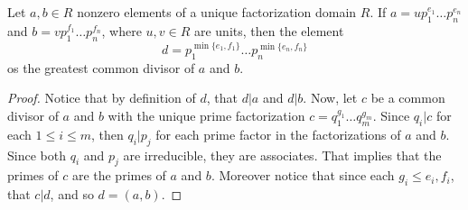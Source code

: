 \begin{proposition}\label{proposition_6.3.4}
  Let $a,b \in R$ nonzero elements of a unique factorization domain $R$. If
  $a=up_1^{e_1} \dots p_n^{e_n}$ and $b=vp_1^{f_1} \dots p_n^{f_n}$, where
  $u,v \in R$ are units, then the element
  \begin{equation*}
    d=p_1^{\min\{e_1,f_1\}} \dots p_n^{\min\{e_n,f_n\}}
  \end{equation*}
  os the greatest common divisor of $a$ and  $b$.
\end{proposition}
\begin{proof}
  Notice that by definition of $d$, that  $d|a$ and  $d|b$. Now, let  $c$ be a
  common divisor of  $a$ and  $b$ with the unique prime factorization
  $c=q_1^{g_1} \dots q_m^{g_m}$. Since $q_i|c$ for each  $1 \leq i \leq m$,
  then  $q_i|p_j$ for each prime factor in the factorizations of  $a$ and
  $b$. Since both  $q_i$ and  $p_j$ are irreducible, they are associates. That
  implies that the primes of  $c$ are the primes of  $a$ and  $b$. Moreover
  notice that since each $g_i \leq e_i,f_i$, that  $c|d$, and so  $d=(a,b)$.
\end{proof}

